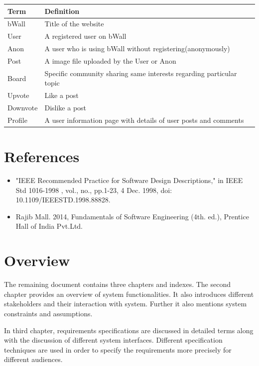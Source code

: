 \documentclass[12pt]{report}
\begin{document}
\begin{tabularx}{\textwidth} { 
  | >{\raggedright\arraybackslash}X 
  | >{\raggedright\arraybackslash}X |}
 \hline
 \textbf{Term} & \textbf{Definition} \\
 \hline
 bWall\index{bWall}  & Title of the website  \\
 \hline
 User\index{User} & A registered user on bWall \\
 \hline 
 Anon\index{Anon} & A user who is using bWall without registering(anonymously) \\
 \hline
 Post & A image file uploaded by the User or Anon \\
 \hline
 Board\index{boards} & Specific community sharing same interests regarding particular topic \\
 \hline
 Upvote\index{upvote} & Like a post \\
 \hline
 Downvote\index{downvote} & Dislike a post \\
 \hline
 Profile & A user information page with details of user posts and comments \\
 
 
\hline
\end{tabularx}

\section{References}

\begin{itemize}
    \item "IEEE Recommended Practice for Software Design Descriptions," in IEEE Std 1016-1998 , vol., no., pp.1-23, 4 Dec. 1998, doi:\\ 10.1109/IEEESTD.1998.88828.
    \item Rajib Mall. 2014, Fundamentals of Software Engineering (4th. ed.), Prentice Hall of India Pvt.Ltd.
\end{itemize}

\section{Overview}
The remaining document contains three chapters and indexes. The second chapter provides an overview of system functionalities. It also introduces different stakeholders and their interaction with system. Further it also mentions system constraints and assumptions.

In third chapter, requirements specifications are discussed in detailed terms along with the discussion of different system interfaces. Different specification techniques are used in order to specify the requirements more precisely for different audiences.
\end{document}
